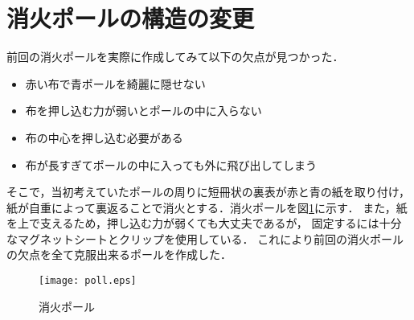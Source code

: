 \documentclass[10pt,a4j]{jarticle}
\begin{document}
\section{消火ポールの構造の変更}
前回の消火ポールを実際に作成してみて以下の欠点が見つかった．
\begin{itemize}
 \item 	赤い布で青ポールを綺麗に隠せない
 \item  布を押し込む力が弱いとポールの中に入らない
 \item  布の中心を押し込む必要がある
 \item  布が長すぎてポールの中に入っても外に飛び出してしまう
\end{itemize}
そこで，当初考えていたポールの周りに短冊状の裏表が赤と青の紙を取り付け，
紙が自重によって裏返ることで消火とする．消火ポールを図\ref{poll}に示す．
また，紙を上で支えるため，押し込む力が弱くても大丈夫であるが，
固定するには十分なマグネットシートとクリップを使用している．
これにより前回の消火ポールの欠点を全て克服出来るポールを作成した．

\begin{figure}[hb]
  \begin{center}
    \texttt{[image: poll.eps]}
    \caption{消火ポール}
    \label{poll}
  \end{center}
\end{figure}
\end{document}
